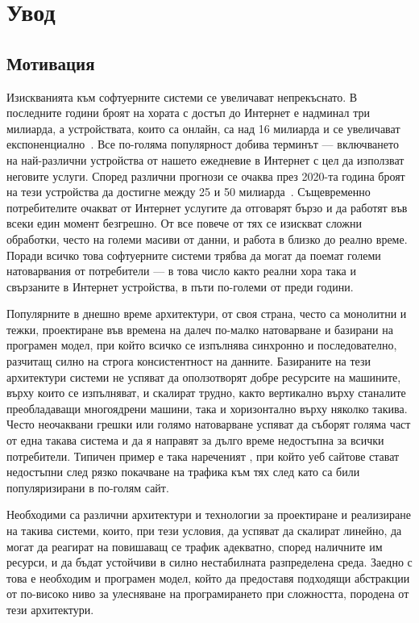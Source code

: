 \chapter{Увод}
\label{ch:introduction}

\section{Мотивация}

Изискванията към софтуерните системи се увеличават непрекъснато. В последните години броят на хората с достъп до Интернет е надминал три милиарда, а устройствата, които са онлайн, са над 16 милиарда и се увеличават експоненциално~\cite{evans2011TheIoT}. Все по-голяма популярност добива терминът  — включването на най-различни устройства от нашето ежедневие в Интернет с цел да използват неговите услуги. Според различни прогнози се очаква през 2020-та година броят на тези устройства да достигне между 25 и 50 милиарда~\cite{evans2011TheIoT, gartner2013IoTGrowth}. Същевременно потребителите очакват от Интернет услугите да отговарят бързо и да работят във всеки един момент безгрешно. От все повече от тях се изискват сложни обработки, често на големи масиви от данни, и работа в близко до реално време. Поради всичко това софтуерните системи трябва да могат да поемат големи натоварвания от потребители — в това число както реални хора така и свързаните в Интернет устройства, в пъти по-големи от преди години.

Популярните в днешно време архитектури, от своя страна, често са монолитни и тежки, проектиране във времена на далеч по-малко натоварване и базирани на програмен модел, при който всичко се изпълнява синхронно и последователно, разчитащ силно на строга консистентност на данните. Базираните на тези архитектури системи не успяват да оползотворят добре ресурсите на машините, върху които се изпълняват, и скалират трудно, както вертикално върху станалите преобладаващи многоядрени машини, така и хоризонтално върху няколко такива. Често неочаквани грешки или голямо натоварване успяват да съборят голяма част от една такава система и да я направят за дълго време недостъпна за всички потребители. Типичен пример е така нареченият , при който уеб сайтове стават недостъпни след рязко покачване на трафика към тях след като са били популяризирани в по-голям сайт.

Необходими са различни архитектури и технологии за проектиране и реализиране на такива системи, които, при тези условия, да успяват да скалират линейно, да могат да реагират на повишаващ се трафик адекватно, според наличните им ресурси, и да бъдат устойчиви в силно нестабилната разпределена среда. Заедно с това е необходим и програмен модел, който да предоставя подходящи абстракции от по-високо ниво за улесняване на програмирането при сложността, породена от тези архитектури.

